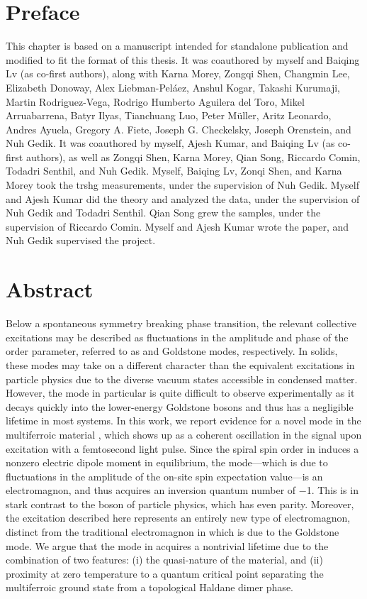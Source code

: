 \section{Preface}

This chapter is based on a manuscript intended for standalone publication and modified to fit the format of this thesis.
It was coauthored by myself and Baiqing Lv (as co-first authors), along with Karna Morey, Zongqi Shen, Changmin Lee, Elizabeth Donoway, Alex Liebman-Pel\'{a}ez, Anshul Kogar, Takashi Kurumaji, Martin Rodriguez-Vega, Rodrigo Humberto Aguilera del Toro, Mikel Arruabarrena, Batyr Ilyas, Tianchuang Luo, Peter M\"{u}ller, Aritz Leonardo, Andres Ayuela, Gregory A. Fiete, Joseph G. Checkelsky, Joseph Orenstein, and Nuh Gedik.
It was coauthored by myself, Ajesh Kumar, and Baiqing Lv (as co-first authors), as well as Zongqi Shen, Karna Morey, Qian Song, Riccardo Comin, Todadri Senthil, and Nuh Gedik.
Myself, Baiqing Lv, Zonqi Shen, and Karna Morey took the \gls{trshg} measurements, under the supervision of Nuh Gedik.
Myself and Ajesh Kumar did the theory and analyzed the data, under the supervision of Nuh Gedik and Todadri Senthil.
Qian Song grew the samples, under the supervision of Riccardo Comin.
Myself and Ajesh Kumar wrote the paper, and Nuh Gedik supervised the project.

\section{Abstract}
Below a spontaneous symmetry breaking phase transition, the relevant collective excitations may be described as fluctuations in the amplitude and phase of the order parameter, referred to as \higgs and Goldstone modes, respectively.
In solids, these modes may take on a different character than the equivalent excitations in particle physics due to the diverse vacuum states accessible in condensed matter.
However, the \higgs mode in particular is quite difficult to observe experimentally as it decays quickly into the lower-energy Goldstone bosons and thus has a negligible lifetime in most systems.
In this work, we report evidence for a novel \higgs mode in the multiferroic material , which shows up as a coherent oscillation in the  signal upon excitation with a femtosecond light pulse.
Since the spiral spin order in  induces a nonzero electric dipole moment in equilibrium, the \higgs mode---which is due to fluctuations in the amplitude of the on-site spin expectation value---is an electromagnon, and thus acquires an inversion quantum number of \num{-1}. 
This is in stark contrast to the \higgs boson of particle physics, which has even parity.
Moreover, the excitation described here represents an entirely new type of electromagnon, distinct from the traditional electromagnon in  which is due to the Goldstone mode.
We argue that the \higgs mode in  acquires a nontrivial lifetime due to the combination of two features: (i) the quasi-\oned nature of the material, and (ii) proximity at zero temperature to a quantum critical point separating the multiferroic ground state from a topological Haldane dimer phase.

